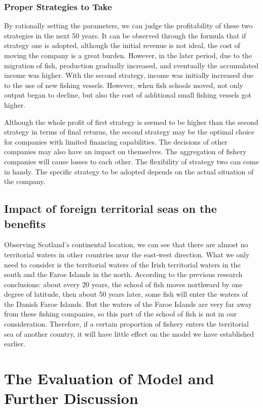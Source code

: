 \documentclass{mcmthesis}
\numberwithin{figure}{section}
\numberwithin{table}{section}
\begin{document}
\subsubsection{Proper Strategies to Take}
By rationally setting the parameters, we can judge the profitability of these two strategies in the next 50 years. It can be observed through the formula that if strategy one is adopted, although the initial revenue is not ideal, the cost of moving the company is a great burden. However, in the later period, due to the migration of fish, production gradually increased, and eventually the accumulated income was higher. With the second strategy, income was initially increased due to the use of new fishing vessels. However, when fish schools moved, not only output began to decline, but also the cost of additional small fishing vessels got higher.

Although the whole profit of first strategy is seemed to be higher than the second strategy in terms of final returns, the second strategy may be the optimal choice for companies with limited financing capabilities. The decisions of other companies may also have an impact on themselves. The aggregation of fishery companies will cause losses to each other. The flexibility of strategy two can come in handy. The specific strategy to be adopted depends on the actual situation of the company.

\subsection{Impact of foreign territorial seas on the benefits}
Observing Scotland's continental location, we can see that there are almost no territorial waters in other countries near the east-west direction. What we only need to consider is the territorial waters of the Irish territorial waters in the south and the Faroe Islands in the north. According to the previous research conclusions: about every 20 years, the school of fish moves northward by one degree of latitude, then about 50 years later, some fish will enter the waters of the Danish Faroe Islands. But the waters of the Faroe Islands are very far away from these fishing companies, so this part of the school of fish is not in our consideration. Therefore, if a certain proportion of fishery enters the territorial sea of another country, it will have little effect on the model we have established earlier.

\section{The Evaluation of Model and Further Discussion}
\end{document}
